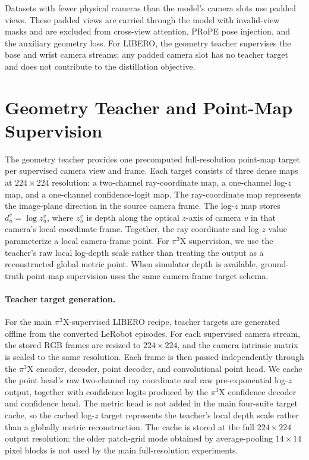 Datasets with fewer physical cameras than the model's camera slots use padded views. These padded views are carried through the model with invalid-view masks and are excluded from cross-view attention, PRoPE pose injection, and the auxiliary geometry loss. For LIBERO, the geometry teacher supervises the base and wrist camera streams; any padded camera slot has no teacher target and does not contribute to the distillation objective.

\section{Geometry Teacher and Point-Map Supervision}
\label{app:pointmap_supervision}

The geometry teacher provides one precomputed full-resolution point-map target per supervised camera view and frame. Each target consists of three dense maps at $224\times224$ resolution: a two-channel ray-coordinate map, a one-channel log-$z$ map, and a one-channel confidence-logit map. The ray-coordinate map represents the image-plane direction in the source camera frame. The log-$z$ map stores $d_u^v=\log z_u^v$, where $z_u^v$ is depth along the optical $z$-axis of camera $v$ in that camera's local coordinate frame. Together, the ray coordinate and log-$z$ value parameterize a local camera-frame point. For $\pi^3$X supervision, we use the teacher's raw local log-depth scale rather than treating the output as a reconstructed global metric point. When simulator depth is available, ground-truth point-map supervision uses the same camera-frame target schema.

\paragraph{Teacher target generation.}
For the main $\pi^3$X-supervised LIBERO recipe, teacher targets are generated offline from the converted LeRobot episodes. For each supervised camera stream, the stored RGB frames are resized to $224\times224$, and the camera intrinsic matrix is scaled to the same resolution. Each frame is then passed independently through the $\pi^3$X encoder, decoder, point decoder, and convolutional point head. We cache the point head's raw two-channel ray coordinate and raw pre-exponential log-$z$ output, together with confidence logits produced by the $\pi^3$X confidence decoder and confidence head. The metric head is not added in the main four-suite target cache, so the cached log-$z$ target represents the teacher's local depth scale rather than a globally metric reconstruction. The cache is stored at the full $224\times224$ output resolution; the older patch-grid mode obtained by average-pooling $14\times14$ pixel blocks is not used by the main full-resolution experiments.

